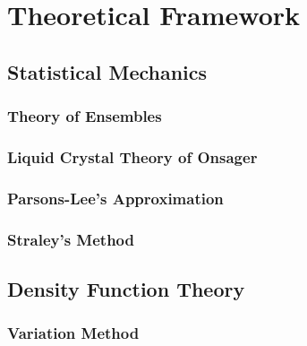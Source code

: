 \newcommand{\mat}[1]{\left(\begin{matrix}#1\end{matrix}\right)}
\newcommand{\arr}[2][n]{#2_1,#2_2,\cdots,#2_{#1}}
\newcommand{\xsim}[1]{\stackrel{#1}{\sim}}
\newcommand{\iprod}[2]{\langle#1,#2\rangle}
\newcommand{\mbb}[1]{\mathbb{#1}}
\newcommand{\mbf}[1]{\mathbf{#1}}
\newcommand{\mcal}[1]{\mathcal{#1}}
\newcommand{\mfk}[1]{\mathfrak{#1}}
\newcommand{\mrm}[1]{\mathrm{#1}}
\newcommand{\mcr}[1]{\mathscr{#1}}
\newcommand{\on}[1]{\operatorname{#1}}
\newcommand{\ol}[1]{\overline{#1}}
\newcommand{\wt}[1]{\widetilde{#1}}
\newcommand{\mr}[1]{\mathring{#1}}
\newcommand{\lr}[1]{\langle{#1}\rangle}
\newcommand{\red}[1]{\textcolor{red}{#1}}
\newcommand{\blue}[1]{\textcolor{blue}{#1}}
\newcommand{\green}[1]{\textcolor{green}{#1}}
\newcommand{\tbf}[1]{\textbf{#1}}
\newcommand{\tit}[1]{\textit{#1}}

\chapter{Theoretical Framework}

\section{Statistical Mechanics}
\subsection{Theory of Ensembles}

\subsection{Liquid Crystal Theory of Onsager}

\subsection{Parsons-Lee's Approximation}

\subsection{Straley's Method}

\section{Density Function Theory}
\subsection{Variation Method}

